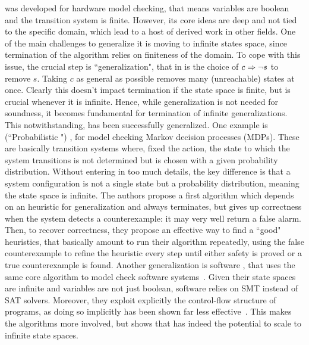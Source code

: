  was developed for hardware model checking, that means variables are boolean and the transition system is finite. However, its core ideas are deep and not tied to the specific domain, which lead to a host of derived work in other fields. One of the main challenges to generalize it is moving to infinite states space, since termination of the algorithm relies on finiteness of the domain. To cope with this issue, the crucial step is ``generalization", that in  is the choice of $c \Rightarrow \lnot s$ to remove $s$. Taking $c$ as general as possible removes many (unreachable) states at once. Clearly this doesn't impact termination if the state space is finite, but is crucial whenever it is infinite. Hence, while generalization is not needed for soundness, it becomes fundamental for termination of infinite generalizations.
This notwithstanding,  has been successfully generalized. One example is  (``Probabilistic ") \cite{BJKKMS20}, for model checking Markov decision processes (MDPs). These are basically transition systems where, fixed the action, the state to which the system transitions is not determined but is chosen with a given probability distribution. Without entering in too much details, the key difference is that a system configuration is not a single state but a probability distribution, meaning the state space is infinite. The authors propose a first algorithm which depends on an heuristic for generalization and always terminates, but gives up correctness when the system detects a counterexample: it may very well return a false alarm. Then, to recover correctness, they propose an effective way to find a ``good" heuristics, that basically amount to run their algorithm repeatedly, using the false counterexample to refine the heuristic every step until either safety is proved or a true counterexample is found.
Another generalization is software , that uses the same core algorithm to model check software systems~\cite{CG12,LNNK20}. Given their state spaces are infinite and variables are not just boolean, software  relies on SMT instead of SAT solvers. Moreover, they exploit explicitly the control-flow structure of programs, as doing so implicitly has been shown far less effective~\cite{CG12}. This makes the algorithms more involved, but shows that  has indeed the potential to scale to infinite state spaces.

